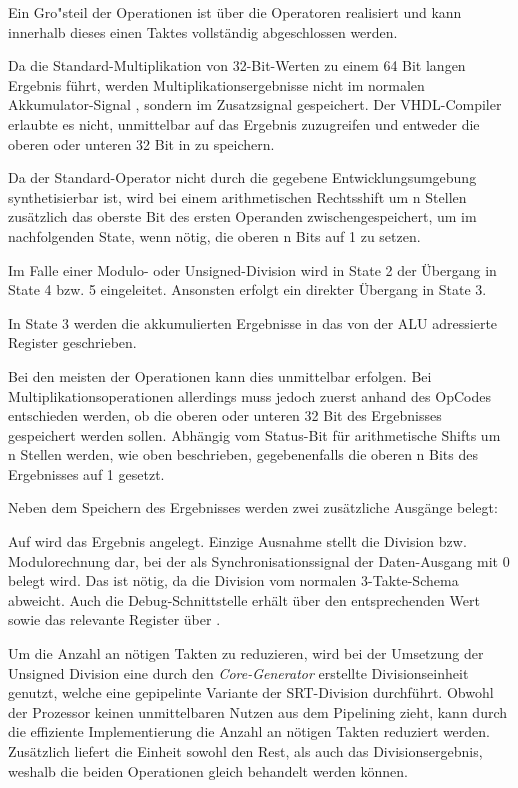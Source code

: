 Ein Gro"steil der Operationen ist \"uber die  Operatoren realisiert und kann innerhalb dieses einen Taktes vollst\"andig abgeschlossen werden.

Da die Standard-Multiplikation von 32-Bit-Werten zu einem 64 Bit langen Ergebnis f\"uhrt, werden Multiplikationsergebnisse nicht im normalen Akkumulator-Signal , sondern im Zusatzsignal  gespeichert. Der VHDL-Compiler erlaubte es nicht, unmittelbar auf das Ergebnis zuzugreifen und entweder die oberen oder unteren 32 Bit in  zu speichern.\vspace{10pt}

Da der Standard-Operator  nicht durch die gegebene Entwicklungsumgebung synthetisierbar ist, wird bei einem arithmetischen Rechtsshift um {n} Stellen zus\"atzlich das oberste Bit des ersten Operanden zwischengespeichert, um im nachfolgenden State, wenn n\"otig, die oberen {n} Bits auf {1} zu setzen.\vspace{10pt}

Im Falle einer Modulo- oder Unsigned-Division wird in State 2 der \"Ubergang in State 4 bzw. 5 eingeleitet. Ansonsten erfolgt ein direkter \"Ubergang in State 3.

In State 3 werden die akkumulierten Ergebnisse in das von der ALU adressierte Register geschrieben.

Bei den meisten der Operationen kann dies unmittelbar erfolgen. Bei Multiplikationsoperationen allerdings muss jedoch zuerst anhand des OpCodes entschieden werden, ob die oberen oder unteren 32 Bit des Ergebnisses gespeichert werden sollen. Abh\"angig vom Status-Bit f\"ur arithmetische Shifts um {n} Stellen werden, wie oben beschrieben, gegebenenfalls die oberen n Bits des Ergebnisses auf {1} gesetzt.\vspace{10pt}


Neben dem Speichern des Ergebnisses werden zwei zus\"atzliche Ausg\"ange belegt:

Auf  wird das Ergebnis angelegt. Einzige Ausnahme stellt die Division bzw. Modulorechnung dar, bei der als Synchronisationssignal der Daten-Ausgang mit 0 belegt wird. Das ist n\"otig, da die Division vom normalen 3-Takte-Schema abweicht.
Auch die Debug-Schnittstelle erh\"alt \"uber  den entsprechenden Wert sowie das relevante Register \"uber .

Um die Anzahl an n\"otigen Takten zu reduzieren, wird bei der Umsetzung der Unsigned Division eine durch den \textit{Core-Generator} erstellte Divisionseinheit genutzt, welche eine gepipelinte Variante der SRT-Division durchf\"uhrt. Obwohl der Prozessor keinen unmittelbaren Nutzen aus dem Pipelining zieht, kann durch die effiziente Implementierung die Anzahl an n\"otigen Takten reduziert werden. Zus\"atzlich liefert die Einheit sowohl den Rest, als auch das Divisionsergebnis, weshalb die beiden Operationen gleich behandelt werden k\"onnen.


